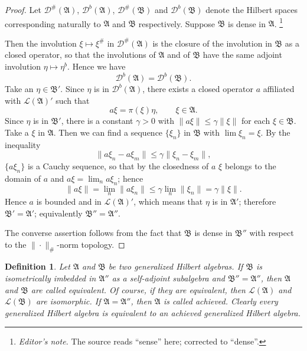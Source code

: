 \documentclass[12pt,b5paper,twoside]{article}
\theoremstyle{takesaki}
\newtheorem{definition}{Definition}[section]
\numberwithin{equation}{section}
\newcounter{editorialnote}
\newcommand{\ednote}[1]{%
  \stepcounter{editorialnote}%
  \begingroup
  \renewcommand{\thefootnote}{E\arabic{editorialnote}}%
  \footnote{\textit{Editor's note.} #1}%
  \addtocounter{footnote}{-1}%
  \endgroup
}
\begin{document}
\begin{proof}
Let $\mathcal D^\#(\mathfrak A)$, $\mathcal D^b(\mathfrak A)$,
$\mathcal D^\#(\mathfrak B)$ and $\mathcal D^b(\mathfrak B)$ denote the
Hilbert spaces corresponding naturally to $\mathfrak A$ and
$\mathfrak B$ respectively.  Suppose $\mathfrak B$ is dense in
$\mathfrak A$.\ednote{The source reads ``sense'' here; corrected to
``dense''.}
Then the involution $\xi\mapsto\xi^\#$ in
$\mathcal D^\#(\mathfrak A)$ is the closure of the involution in
$\mathfrak B$ as a closed operator, so that the involutions of
$\mathfrak A$ and of $\mathfrak B$ have the same adjoint involution
$\eta\mapsto\eta^b$.  Hence we have
\[
 \mathcal D^b(\mathfrak A)=\mathcal D^b(\mathfrak B).
\]
Take an $\eta\in\mathfrak B'$.  Since $\eta$ is in
$\mathcal D^b(\mathfrak A)$, there exists a closed operator $a$
affiliated with $\mathcal L(\mathfrak A)'$ such that
\[
 a\xi=\pi(\xi)\eta,\qquad \xi\in\mathfrak A.
\]
Since $\eta$ is in $\mathfrak B'$, there is a constant $\gamma>0$ with
$\|a\xi\|\leq\gamma\|\xi\|$ for each $\xi\in\mathfrak B$.  Take a
$\xi$ in $\mathfrak A$.  Then we can find a sequence $\{\xi_n\}$ in
$\mathfrak B$ with $\lim\xi_n=\xi$.  By the inequality
\[
 \|a\xi_n-a\xi_m\|\leq\gamma\|\xi_n-\xi_m\|,
\]
$\{a\xi_n\}$ is a Cauchy sequence, so that by the closedness of $a$
$\xi$ belongs to the domain of $a$ and $a\xi=\lim_n a\xi_n$; hence
\[
 \|a\xi\|=\lim_n\|a\xi_n\|
 \leq\gamma\lim_n\|\xi_n\|=\gamma\|\xi\|.
\]
Hence $a$ is bounded and in $\mathcal L(\mathfrak A)'$, which means
that $\eta$ is in $\mathfrak A'$; therefore
$\mathfrak B'=\mathfrak A'$; equivalently
$\mathfrak B''=\mathfrak A''$.

The converse assertion follows from the fact that $\mathfrak B$ is
dense in $\mathfrak B''$ with respect to the $\|\cdot\|_\#$-norm
topology.
\end{proof}

\begin{definition}\label{def:5.1}
Let $\mathfrak A$ and $\mathfrak B$ be two generalized Hilbert
algebras.  If $\mathfrak B$ is isometrically imbedded in
$\mathfrak A''$ as a self-adjoint subalgebra and
$\mathfrak B''=\mathfrak A''$, then $\mathfrak A$ and $\mathfrak B$ are
called equivalent.  Of course, if they are equivalent, then
$\mathcal L(\mathfrak A)$ and $\mathcal L(\mathfrak B)$ are isomorphic.
If $\mathfrak A=\mathfrak A''$, then $\mathfrak A$ is called achieved.
Clearly every generalized Hilbert algebra is equivalent to an achieved
generalized Hilbert algebra.
\end{definition}
\end{document}
